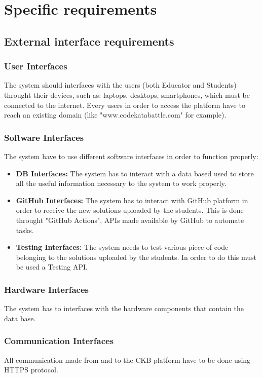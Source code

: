 \documentclass{article}
\begin{document}
{\section{Specific requirements}
\subsection{External interface requirements}
    \subsubsection{User Interfaces}
        The system should interfaces with the users (both Educator and Students) throught their 
        devices, such as: laptops, desktops, smartphones, which must be connected to the internet.
        Every users in order to access the platform have to reach an existing domain (like "www.codekatabattle.com"
        for example).
        
    \subsubsection{Software Interfaces}
        The system have to use different software interfaces in order to function properly:
        \begin{itemize}
            \item \textbf{DB Interfaces:} The system has to interact with a data based
            used to store all the useful information necessary to the system to work properly.
            \item \textbf{GitHub Interfaces:} The system has to interact with GitHub platform
            in order to receive the new solutions uploaded by the students. This is done throught
            "GitHub Actions", APIs made available by GitHub to automate tasks.
            \item \textbf{Testing Interfaces:} The system needs to test various piece of code
            belonging to the solutions uploaded by the students. In order to do this must be used
            a Testing API. 
        \end{itemize}

    \subsubsection{Hardware Interfaces}
        The system has to interfaces with the hardware components that contain
        the data base.
    \subsubsection{Communication Interfaces}
        All communication made from and to the CKB platform have to be done
        using HTTPS protocol.
}
\end{document}
